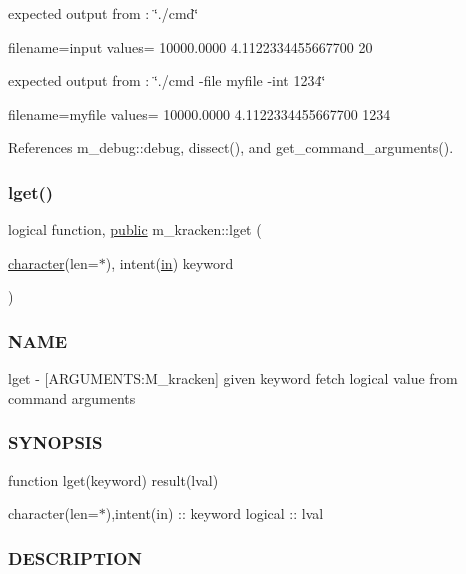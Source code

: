 expected output from \+: \char`\"{}./cmd\char`\"{} \begin{DoxyVerb}   filename=input
   values= 10000.0000  4.1122334455667700  20
\end{DoxyVerb}


expected output from \+: \char`\"{}./cmd -\/file myfile -\/int 1234\char`\"{} \begin{DoxyVerb}   filename=myfile
   values= 10000.0000  4.1122334455667700  1234 \end{DoxyVerb}
 

References m\+\_\+debug\+::debug, dissect(), and get\+\_\+command\+\_\+arguments().

\mbox{\label{namespacem__kracken_a7141acd7a00c1a5aa5f90612a0414b63}} 
\subsubsection{\texorpdfstring{lget()}{lget()}}
{\footnotesize\ttfamily logical function, \hyperlink{M__stopwatch_83_8txt_a2f74811300c361e53b430611a7d1769f}{public} m\+\_\+kracken\+::lget (\begin{DoxyParamCaption}\item[{\hyperlink{option__stopwatch_83_8txt_abd4b21fbbd175834027b5224bfe97e66}{character}(len=$\ast$), intent(\hyperlink{M__journal_83_8txt_afce72651d1eed785a2132bee863b2f38}{in})}]{keyword }\end{DoxyParamCaption})}



\subsubsection*{N\+A\+ME}

lget -\/ \mbox{[}A\+R\+G\+U\+M\+E\+N\+TS\+:M\+\_\+kracken\mbox{]} given keyword fetch logical value from command arguments \subsubsection*{S\+Y\+N\+O\+P\+S\+IS}

function lget(keyword) result(lval)

character(len=$\ast$),intent(in) \+:\+: keyword logical \+:\+: lval \subsubsection*{D\+E\+S\+C\+R\+I\+P\+T\+I\+ON}


